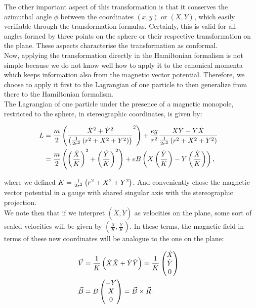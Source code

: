 The other important aspect of this transformation is that it conserves the azimuthal angle $\phi$ between the coordinates $(x,y)$ or $(X,Y)$, which easily verifiable through the transformation formulas. Certainly, this is valid for all angles formed by three points on the sphere or their respective transformation on the plane. These aspects characterise the transformation as conformal.\\

Now, applying the transformation directly in the Hamiltonian formalism is not simple because we do not know well how to apply it to the canonical momenta which keeps information also from the magnetic vector potential. Therefore, we choose to apply it first to the Lagrangian of one particle to then generalize from there to the Hamiltonian formalism.\\

The Lagrangian of one particle under the presence of a magnetic monopole, restricted to the sphere, in stereographic coordinates, is given by:

\begin{align}
L &= \frac{m}{2}\left( \frac{\dot{X}^2+\dot{Y}^2}{\left( \frac{1}{2r^2}\left( r^2+X^2+Y^2 \right) \right)}^2 \right) + \frac{eg}{r^2}\frac{X\dot{Y}-Y\dot{X}}{\frac{1}{2r^2}\left( r^2+X^2+Y^2 \right)} \nonumber \\
&= \frac{m}{2}\left( \left( \frac{\dot{X}}{K} \right)^2+\left( \frac{\dot{Y}}{K} \right)^2 \right) + eB\left( X\left( \frac{\dot{Y}}{K} \right)-Y\left( \frac{\dot{X}}{K} \right) \right),
\end{align}

where we defined $K=\frac{1}{2r^2}\left( r^2+X^2+Y^2 \right)$. And conveniently chose the magnetic vector potential in a gauge with shared singular axis with the stereographic projection.\\

We note then that if we interpret $(\dot{X},\dot{Y})$ as velocities on the plane, some sort of scaled velocities will be given by $(\frac{\dot{X}}{K},\frac{\dot{Y}}{K})$. In these terms, the magnetic field in terms of these new coordinates will be analogue to the one on the plane:

\begin{align*}
\vec{V} &= \frac{1}{K}\left( \dot{X}\hat{X} + \dot{Y}\hat{Y} \right) = \frac{1}{K}\begin{pmatrix} \dot{X} \\ \dot{Y}\\0 \end{pmatrix} \\
\vec{B} &= B\begin{pmatrix} -Y \\ X \\ 0 \end{pmatrix} = \vec{B}\times \vec{R} .
\end{align*}

